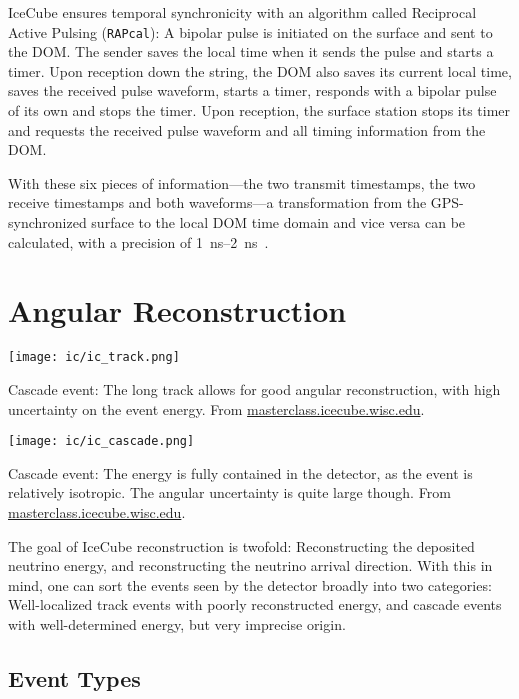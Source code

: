 IceCube ensures temporal synchronicity with an algorithm called Reciprocal Active Pulsing (\texttt{RAPcal}): A bipolar pulse is initiated on the surface and sent to the DOM. The sender saves the local time when it sends the pulse and starts a timer. Upon reception down the string, the DOM also saves its current local time, saves the received pulse waveform, starts a timer, responds with a bipolar pulse of its own and stops the timer. Upon reception, the surface station stops its timer and requests the received pulse waveform and all timing information from the DOM.

With these six pieces of information---the two transmit timestamps, the two receive timestamps and both waveforms---a transformation from the GPS-synchronized surface to the local DOM time domain and vice versa can be calculated, with a precision of \SIrange{1}{2}{\ns}~\cite{Abbasi2009}.

\section{Angular Reconstruction}\label{reconstruction}

\begin{marginfigure}
    \texttt{[image: ic/ic\_track.png]}
    \caption[Track event in IceCube]{Cascade event: The long track allows for good angular reconstruction, with high uncertainty on the event energy. From \url{masterclass.icecube.wisc.edu}.}
\end{marginfigure}
\begin{marginfigure}
    \texttt{[image: ic/ic\_cascade.png]}
    \caption[Cascade event in IceCube]{Cascade event: The energy is fully contained in the detector, as the event is relatively isotropic. The angular uncertainty is quite large though. From \url{masterclass.icecube.wisc.edu}.}
\end{marginfigure}

The goal of IceCube reconstruction is twofold: Reconstructing the deposited neutrino energy, and reconstructing the neutrino arrival direction. With this in mind, one can sort the events seen by the detector broadly into two categories: Well-localized track events with poorly reconstructed energy, and cascade events with well-determined energy, but very imprecise origin.

\subsection{Event Types}\label{ic_event_types}

